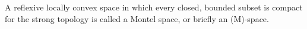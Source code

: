 A reflexive locally convex space in which every closed, bounded subset is compact for the strong topology is called a Montel space, or briefly an (M)-space.
